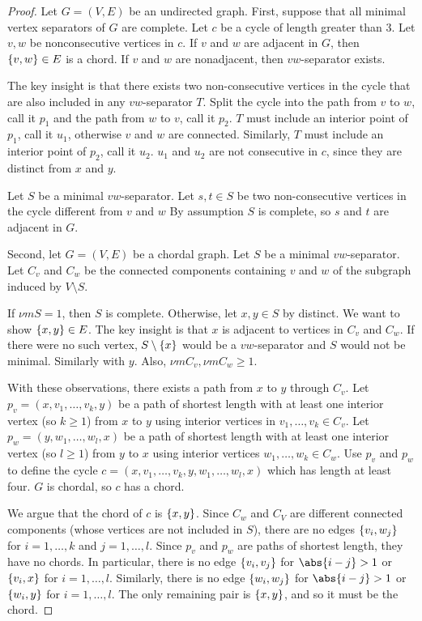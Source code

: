 \begin{proof}Let $G = (V, E)$ be an undirected graph.
First, suppose that all minimal vertex separators of $G$ are complete.
Let $c$ be a cycle of length greater than 3.
Let $v, w$ be nonconsecutive vertices in $c$.
If $v$ and $w$ are adjacent in $G$, then $\{v, w\} \in E$ is a chord.
If $v$ and $w$ are nonadjacent, then $vw$-separator exists.

The key insight is that there exists two non-consecutive vertices in the cycle that are also included in any $vw$-separator $T$.
Split the cycle into the path from $v$ to $w$, call it $p_1$ and the path from $w$ to $v$, call it $p_2$.
$T$ must include an interior point of $p_1$, call it $u_1$, otherwise $v$ and $w$ are connected.
Similarly, $T$ must include an interior point of $p_2$, call it $u_2$.
$u_1$ and $u_2$ are not consecutive in $c$, since they are distinct from $x$ and $y$.

Let $S$ be a minimal $vw$-separator.
Let $s, t \in S$ be two non-consecutive vertices in the cycle different from $v$ and $w$
By assumption $S$ is complete, so $s$ and $t$ are adjacent in $G$.

Second, let $G = (V, E)$ be a chordal graph.
Let $S$ be a minimal $vw$-separator.
Let $C_v$ and $C_w$ be the connected components containing $v$ and $w$ of the subgraph induced by $V \setminus S$.

If $\nu m{S} = 1$, then $S$ is complete.
Otherwise, let $x, y \in S$ by distinct.
We want to show $\{x, y\} \in E$.
The key insight is that $x$ is adjacent to vertices in $C_v$ and $C_w$.
If there were no such vertex, $S \setminus \{x\}$ would be a $vw$-separator and $S$ would not be minimal.
Similarly with $y$.
Also, $\nu m{C_v}, \nu m{C_w} \geq 1$.

With these observations, there exists a path from $x$ to $y$ through $C_v$.
Let $p_v = (x, v_1, \dots , v_k, y)$ be a path of shortest length with at least one interior vertex (so $k \geq 1$) from $x$ to $y$ using interior vertices in $v_1, \dots , v_k \in C_v$.
Let $p_w = (y, w_1, \dots , w_l, x)$ be a path of shortest length with at least one interior vertex (so $l \geq 1$) from $y$ to $x$ using interior vertices $w_1, \dots , w_k \in C_w$.
Use $p_v$ and $p_w$ to define the cycle $c = (x, v_1, \dots , v_k, y, w_1, \dots , w_l, x)$ which has length at least four.
$G$ is chordal, so $c$ has a chord.

We argue that the chord of $c$ is $\{x, y\}$.
Since $C_w$ and $C_V$ are different connected components (whose vertices are not included in $S$), there are no edges $\{v_i, w_j\}$ for $i = 1, \dots , k$ and $j = 1, \dots , l$.
Since $p_v$ and $p_w$ are paths of shortest length, they have no chords.
In particular, there is no edge $\{v_i, v_j\}$ for $\abs{i - j} > 1$ or $\{v_i, x\}$ for $i = 1, \dots , l$.
Similarly, there is no edge $\{w_i, w_j\}$ for $\abs{i - j} > 1$ or $\{w_i, y\}$ for $i = 1, \dots , l$.
The only remaining pair is $\{x, y\}$, and so it must be the chord.
\end{proof}